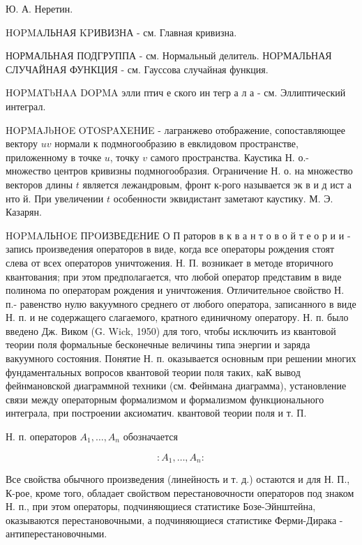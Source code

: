 \documentclass[10pt]{article}
\begin{document}
Ю. А. Неретин.



HOPMAЛЬНАЯ KPИВИЗНА - см. Главная кривизна.



НОРМАЛЬНАЯ ПОДГРУППА - см. Нормальный делитель. НОPМАЛЬНАЯ СЛУЧАЙНАЯ ФУНКЦИЯ - см. Гауссова случайная функция.



HOPMATbHAA DOPMA элли птич е ского ин тегр а л а - см. Эллиптический интеграл.



HOPMAJbHOE OTOSPAXEHИE - лагранжево отображение, сопоставляющее вектору $u v$ нормали к подмногообразию в евклидовом пространстве, приложенному в точке $u$, точку $v$ самого пространства. Каустика Н. о.- множество центров кривизны подмногообразия. Ограничение Н. о. на множество векторов длины $t$ является лежандровым, фронт к-рого называется эк в и д ист а нто й. При увеличении $t$ особенности эквидистант заметают каустику. М. Э. Казарян.



HOPMAЛЬHOE ПPOИЗВЕДEНИЕ О П раторов в к в а н т о в о й т е о р и и - запись произведения операторов в виде, когда все операторы рождения стоят слева от всех операторов уничтожения. Н. П. возникает в методе вторичного квантования; при этом предполагается, что любой оператор представим в виде полинома по операторам рождения и уничтожения. Отличительное свойство Н. п.- равенство нулю вакуумного среднего от любого оператора, записанного в виде Н. п. и не содержащего слагаемого, кратного единичному оператору. Н. п. было введено Дж. Виком (G. Wick, 1950) для того, чтобы исключить из квантовой теории поля формальные бесконечные величины типа энергии и заряда вакуумного состояния. Понятие Н. п. оказывается основным при решении многих фундаментальных вопросов квантовой теории поля таких, каК вывод фейнмановской диаграммной техники (см. Фейнмана диаграмма), установление связи между операторным формализмом и формализмом функционального интеграла, при построении аксиоматич. квантовой теории поля и т. П.



Н. п. операторов $A_{1}, \ldots, A_{n}$ обозначается



\[

: A_{1}, \ldots, A_{n}:

\]



Все свойства обычного произведения (линейность и т. д.) остаются и для Н. П., К-рое, кроме того, обладает свойством перестановочности операторов под знаком Н. п., при этом операторы, подчиняющиеся статистике Бозе-Эйнштейна, оказываются перестановочными, а подчиняющиеся статистике Ферми-Дирака - антиперестановочными.
\end{document}

